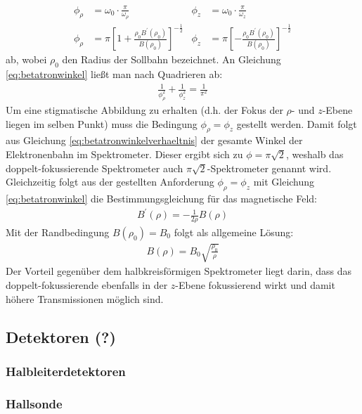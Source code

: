 \documentclass[11pt, a4paper]{article}
\numberwithin{equation}{section}
\begin{document}
\begin{align}
	\phi_\rho &= \omega_0 \cdot \frac{\pi}{\omega_\rho} & \phi_z &= \omega_0 \cdot \frac{\pi}{\omega_z}\\
	\phi_\rho &= \pi \left[ 1+ \frac{\rho_0 B^\prime(\rho_0)}{B(\rho_0)} \right]^{-\frac{1}{2}} & \phi_z &= \pi \left[ -\frac{\rho_0 B^\prime(\rho_0)}{B(\rho_0)} \right]^{-\frac{1}{2}} \label{eq:betatronwinkel}
\end{align}
ab, wobei $\rho_0$ den Radius der Sollbahn bezeichnet.
An Gleichung \eqref{eq:betatronwinkel} ließt man nach Quadrieren ab:
\begin{align}
	\frac{1}{\phi_\rho^2} + \frac{1}{\phi_z^2} = \frac{1}{\pi^2} \label{eq:betatronwinkelverhaeltnis}
\end{align}
Um eine stigmatische Abbildung zu erhalten (d.h. der Fokus der $\rho$- und $z$-Ebene liegen im selben Punkt) muss die Bedingung $\phi_\rho = \phi_z$ gestellt werden.
Damit folgt aus Gleichung \eqref{eq:betatronwinkelverhaeltnis} der gesamte Winkel der Elektronenbahn im Spektrometer.
Dieser ergibt sich zu $\phi = \pi \sqrt{2}$, weshalb das doppelt-fokussierende Spektrometer auch $\pi \sqrt{2}$-Spektrometer genannt wird.
Gleichzeitig folgt aus der gestellten Anforderung $\phi_\rho = \phi_z$ mit Gleichung \eqref{eq:betatronwinkel} die Bestimmungsgleichung für das magnetische Feld:
\begin{align}
	B^\prime(\rho) = - \frac{1}{2 \rho} B(\rho)
\end{align}
Mit der Randbedingung $B(\rho_0) = B_0$ folgt als allgemeine Lösung:
\begin{align}
	B(\rho) = B_0 \sqrt{\frac{\rho_0}{\rho}}
\end{align}
Der Vorteil gegenüber dem halbkreisförmigen Spektrometer liegt darin, dass das doppelt-fokussierende ebenfalls in der $z$-Ebene fokussierend wirkt und damit höhere Transmissionen möglich sind.

\subsection{Detektoren (?)}
\subsubsection{Halbleiterdetektoren}

\subsubsection{Hallsonde}
\end{document}
